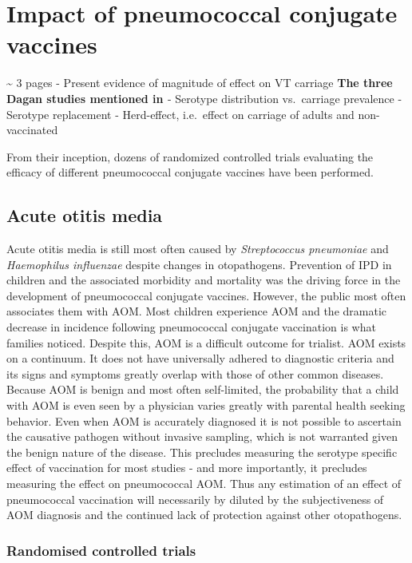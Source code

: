 \documentclass[]{book}
\theoremstyle{definition}
\theoremstyle{definition}
\theoremstyle{definition}
\theoremstyle{remark}
\begin{document}
\section{Impact of pneumococcal conjugate
vaccines}\label{impact-of-pneumococcal-conjugate-vaccines}

\textasciitilde{} 3 pages - Present evidence of magnitude of effect on
VT carriage \textbf{The three Dagan studies mentioned in
\citep{Eskola2001}} - Serotype distribution vs.~carriage prevalence -
Serotype replacement - Herd-effect, i.e.~effect on carriage of adults
and non-vaccinated

From their inception, dozens of randomized controlled trials evaluating
the efficacy of different pneumococcal conjugate vaccines have been
performed.

\subsection{Acute otitis media}\label{acute-otitis-media-1}

Acute otitis media is still most often caused by \emph{Streptococcus
pneumoniae} and \emph{Haemophilus influenzae} despite changes in
otopathogens. Prevention of IPD in children and the associated morbidity
and mortality was the driving force in the development of pneumococcal
conjugate vaccines. However, the public most often associates them with
AOM. Most children experience AOM and the dramatic decrease in incidence
following pneumococcal conjugate vaccination is what families noticed.
Despite this, AOM is a difficult outcome for trialist. AOM exists on a
continuum. It does not have universally adhered to diagnostic criteria
and its signs and symptoms greatly overlap with those of other common
diseases. Because AOM is benign and most often self-limited, the
probability that a child with AOM is even seen by a physician varies
greatly with parental health seeking behavior. Even when AOM is
accurately diagnosed it is not possible to ascertain the causative
pathogen without invasive sampling, which is not warranted given the
benign nature of the disease. This precludes measuring the serotype
specific effect of vaccination for most studies - and more importantly,
it precludes measuring the effect on pneumococcal AOM. Thus any
estimation of an effect of pneumococcal vaccination will necessarily by
diluted by the subjectiveness of AOM diagnosis and the continued lack of
protection against other otopathogens.

\subsubsection{Randomised controlled
trials}\label{randomised-controlled-trials}
\end{document}
